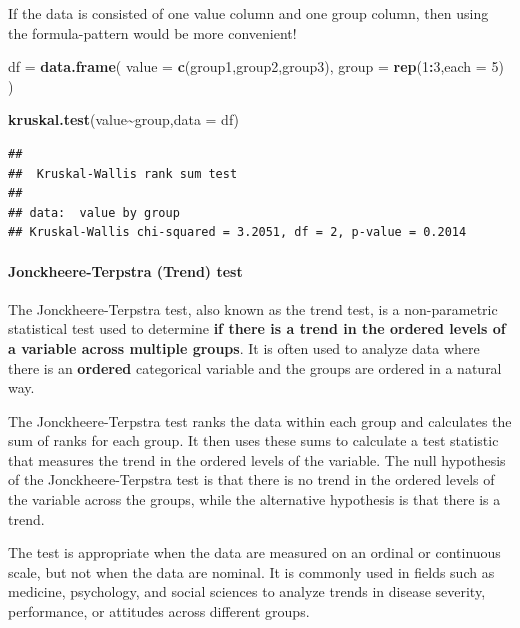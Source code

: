\documentclass[
]{ctexart}
\newenvironment{Shaded}{\begin{snugshade}}{\end{snugshade}}
\newcommand{\AttributeTok}[1]{\textcolor[rgb]{0.13,0.29,0.53}{#1}}
\newcommand{\DecValTok}[1]{\textcolor[rgb]{0.00,0.00,0.81}{#1}}
\newcommand{\FunctionTok}[1]{\textcolor[rgb]{0.13,0.29,0.53}{\textbf{#1}}}
\newcommand{\NormalTok}[1]{#1}
\newcommand{\OtherTok}[1]{\textcolor[rgb]{0.56,0.35,0.01}{#1}}
\newcommand{\SpecialCharTok}[1]{\textcolor[rgb]{0.81,0.36,0.00}{\textbf{#1}}}
\begin{document}
If the data is consisted of one value column and one group column, then
using the formula-pattern would be more convenient!

\begin{Shaded}
\begin{Highlighting}[]
\NormalTok{df }\OtherTok{=} \FunctionTok{data.frame}\NormalTok{(}
  \AttributeTok{value =} \FunctionTok{c}\NormalTok{(group1,group2,group3),}
  \AttributeTok{group =} \FunctionTok{rep}\NormalTok{(}\DecValTok{1}\SpecialCharTok{:}\DecValTok{3}\NormalTok{,}\AttributeTok{each =} \DecValTok{5}\NormalTok{)}
\NormalTok{)}

\FunctionTok{kruskal.test}\NormalTok{(value}\SpecialCharTok{\textasciitilde{}}\NormalTok{group,}\AttributeTok{data =}\NormalTok{ df)}
\end{Highlighting}
\end{Shaded}

\begin{verbatim}
## 
##  Kruskal-Wallis rank sum test
## 
## data:  value by group
## Kruskal-Wallis chi-squared = 3.2051, df = 2, p-value = 0.2014
\end{verbatim}

\hypertarget{jonckheere-terpstra-trend-test}{%
\paragraph{Jonckheere-Terpstra (Trend)
test}\label{jonckheere-terpstra-trend-test}}

The Jonckheere-Terpstra test, also known as the trend test, is a
non-parametric statistical test used to determine \textbf{if there is a
trend in the ordered levels of a variable across multiple groups}. It is
often used to analyze data where there is an \textbf{ordered}
categorical variable and the groups are ordered in a natural way.

The Jonckheere-Terpstra test ranks the data within each group and
calculates the sum of ranks for each group. It then uses these sums to
calculate a test statistic that measures the trend in the ordered levels
of the variable. The null hypothesis of the Jonckheere-Terpstra test is
that there is no trend in the ordered levels of the variable across the
groups, while the alternative hypothesis is that there is a trend.

The test is appropriate when the data are measured on an ordinal or
continuous scale, but not when the data are nominal. It is commonly used
in fields such as medicine, psychology, and social sciences to analyze
trends in disease severity, performance, or attitudes across different
groups.
\end{document}
